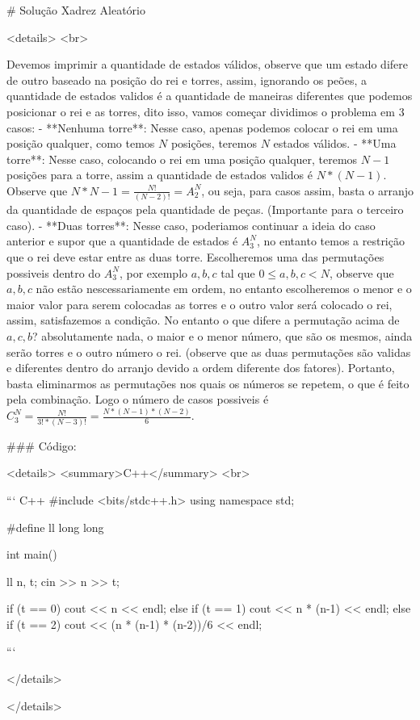  # Solução Xadrez Aleatório

<details>
<br>

Devemos imprimir a quantidade de estados válidos, observe que um estado difere de outro baseado na posição do rei e torres, assim, ignorando os peões, a quantidade de estados validos é a quantidade de maneiras diferentes que podemos posicionar o rei e as torres, dito isso, vamos começar dividimos o problema em 3 casos:
- **Nenhuma torre**:
	Nesse caso, apenas podemos colocar o rei em uma posição qualquer, como temos $N$ posições, teremos $N$ estados válidos.
- **Uma torre**:
	Nesse caso, colocando o rei em uma posição qualquer, teremos $N-1$ posições para a torre, assim a quantidade de estados validos é $N * (N-1)$.
	Observe que $N * N-1 = \frac{N!}{(N-2)!} =  A^{N}_{2}$, ou seja, para casos assim, basta o arranjo da quantidade de espaços pela quantidade de peças. (Importante para o terceiro caso).
- **Duas torres**:
	Nesse caso, poderiamos continuar a ideia do caso anterior e supor que a quantidade de estados é $A^{N}_{3}$, no entanto temos a restrição que o rei deve estar entre as duas torre.
	Escolheremos uma das permutações possiveis dentro do $A^{N}_{3}$, por exemplo $a, b, c$ tal que  $0 \le a, b, c < N$, observe que $a, b, c$ não estão nescessariamente em ordem, no entanto escolheremos o menor e o maior valor para serem colocadas as torres e o outro valor será colocado o rei, assim, satisfazemos a condição.
	No entanto o que difere a permutação acima de $a, c, b$? absolutamente nada, o maior e o menor número, que são os mesmos, ainda serão torres e o outro número o rei. (observe que as duas permutações são validas e diferentes dentro do arranjo devido a ordem diferente dos fatores). 
	Portanto, basta eliminarmos as permutações nos quais os números se repetem, o que é feito pela combinação.
	Logo o número de casos possiveis é $C^{N}_{3} = \frac{N!}{3! * (N-3)!} = \frac{N * (N-1) * (N-2)}{6}$.

### Código:

<details>
<summary>C++</summary>
<br>
	
``` C++
#include <bits/stdc++.h>
using namespace std;

#define ll long long

int main() {
    ll n, t;
    cin >> n >> t;

    if (t == 0) cout << n << endl;
    else if (t == 1) cout << n * (n-1) << endl;
    else if (t == 2) cout << (n * (n-1) * (n-2))/6 << endl;
}
```

</details>

</details>

